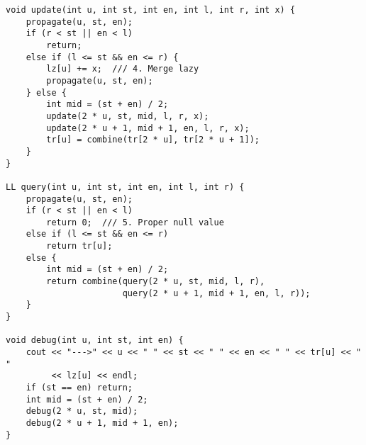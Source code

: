 \documentclass[FSZ,a4paper,onesided]{article}
\begin{document}
\begin{multicols*}{\COLS}
\begin{lstlisting}
void update(int u, int st, int en, int l, int r, int x) {
    propagate(u, st, en);
    if (r < st || en < l)
        return;
    else if (l <= st && en <= r) {
        lz[u] += x;  /// 4. Merge lazy
        propagate(u, st, en);
    } else {
        int mid = (st + en) / 2;
        update(2 * u, st, mid, l, r, x);
        update(2 * u + 1, mid + 1, en, l, r, x);
        tr[u] = combine(tr[2 * u], tr[2 * u + 1]);
    }
}

LL query(int u, int st, int en, int l, int r) {
    propagate(u, st, en);
    if (r < st || en < l)
        return 0;  /// 5. Proper null value
    else if (l <= st && en <= r)
        return tr[u];
    else {
        int mid = (st + en) / 2;
        return combine(query(2 * u, st, mid, l, r),
                       query(2 * u + 1, mid + 1, en, l, r));
    }
}

void debug(int u, int st, int en) {
    cout << "--->" << u << " " << st << " " << en << " " << tr[u] << " "
         << lz[u] << endl;
    if (st == en) return;
    int mid = (st + en) / 2;
    debug(2 * u, st, mid);
    debug(2 * u + 1, mid + 1, en);
}

\end{lstlisting}

\end{multicols*}
\end{document}

